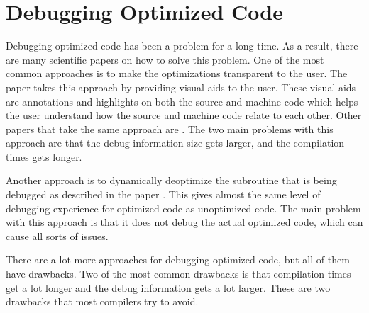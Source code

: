
\section{Debugging Optimized Code}


Debugging optimized code has been a problem for a long time.
As a result, there are many scientific papers on how to solve this problem.
One of the most common approaches is to make the optimizations transparent to the user.
The paper \cite{edselc.2-52.0-8497669319919920107} takes this approach by providing visual aids to the user.
These visual aids are annotations and highlights on both the source and machine code which helps the user understand how the source and machine code relate to each other.
Other papers that take the same approach are \cite{adl1996source, edselc.2-52.0-002842706219940105}.
The two main problems with this approach are that the debug information size gets larger, and the compilation times gets longer.


Another approach is to dynamically deoptimize the subroutine that is being debugged as described in the paper \cite{edselc.2-52.0-002699386519920107}.
This gives almost the same level of debugging experience for optimized code as unoptimized code.
The main problem with this approach is that it does not debug the actual optimized code, which can cause all sorts of issues.


There are a lot more approaches for debugging optimized code, but all of them have drawbacks.
Two of the most common drawbacks is that compilation times get a lot longer and the debug information gets a lot larger.
These are two drawbacks that most compilers try to avoid.



